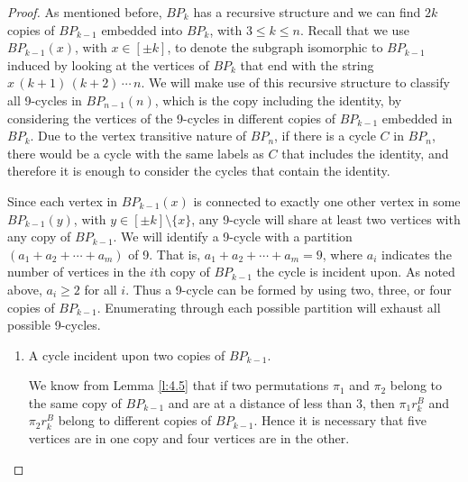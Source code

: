 \documentclass[final]{dmtcs-episciences}
\numberwithin{equation}{section}
\begin{document}
\begin{proof}
As mentioned before, $BP_k$ has a recursive structure and we can find $2k$ copies of $BP_{k-1}$ embedded into $BP_k$, with $3\leq k\leq n$. Recall that we use $BP_{k-1}(x)$, with $x\in[\pm k]$, to denote the subgraph isomorphic to $BP_{k-1}$ induced by looking at the vertices of $BP_k$ that end with the string $x\,(k+1)\,(k+2)\,\cdots\,n$. We will make use of this recursive structure to classify all 9-cycles in $BP_{n-1}(n)$, which is the copy including the identity, by considering the vertices of the 9-cycles in different copies of $BP_{k-1}$ embedded in $BP_k$. Due to the vertex transitive nature of $BP_{n}$, if there is a cycle $C$ in $BP_n$, there would be a cycle with the same labels as $C$ that includes the identity, and therefore it is enough to consider the cycles that contain the identity. 

Since each vertex in $BP_{k-1}(x)$ is connected to exactly one other vertex in some $BP_{k-1}(y)$, with $y\in[\pm k]\setminus\{x\}$, any 9-cycle will share at least two vertices with any copy of $BP_{k-1}$. We will identify a 9-cycle with a partition $(a_1+a_2+\cdots+a_m)$ of 9. That is, $a_1+a_2+\cdots+a_m=9$, where $a_i$ indicates the number of vertices in the $i${th} copy of $BP_{k-1}$ the cycle is incident upon. %
 As noted above, $a_i \geq 2$ for all $i$. Thus a 9-cycle can be formed by using two, three, or four copies of $BP_{k-1}$. Enumerating through each possible partition will exhaust all possible 9-cycles.
\begin{enumerate}
\item[CASE I :-] A cycle incident upon two copies of $BP_{k-1}$.

We know from Lemma \ref{l:4.5} that if two permutations $\pi_1$ and $\pi_2$ belong to the same copy of $BP_{k-1}$ and are at a distance of less than 3, then $\pi_1r^B_k$ and $\pi_2r^B_k$ belong to different copies of $BP_{k-1}$. Hence it is necessary that five vertices are in one copy and four vertices are in the other.


\end{enumerate}
\end{proof}
\end{document}
